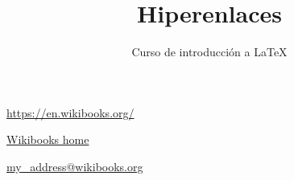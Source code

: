 \documentclass[10pt,letterpaper]{article}
\title{Hiperenlaces}
\author{Curso de introducción a LaTeX}
\begin{document}
\maketitle
\url{https://en.wikibooks.org/}

\href{https://en.wikibooks.org/}{Wikibooks home}

\href{mailto:errodriguez@ipn.mx?cc=algonzaleze@ipn.mx&subject=Enviados%20desde%20el%20documento%20hiperenlaces.tex&body=Es%20un%20ejemplo...}{my\_address@wikibooks.org}
\end{document}
